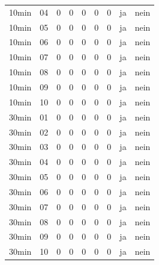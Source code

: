 \begin{longtable}{llrrrrrll}
10min & 04 & 0 & 0 & 0 & 0 & 0 & ja & nein \\
10min & 05 & 0 & 0 & 0 & 0 & 0 & ja & nein \\
10min & 06 & 0 & 0 & 0 & 0 & 0 & ja & nein \\
10min & 07 & 0 & 0 & 0 & 0 & 0 & ja & nein \\
10min & 08 & 0 & 0 & 0 & 0 & 0 & ja & nein \\
10min & 09 & 0 & 0 & 0 & 0 & 0 & ja & nein \\
10min & 10 & 0 & 0 & 0 & 0 & 0 & ja & nein \\
30min & 01 & 0 & 0 & 0 & 0 & 0 & ja & nein \\
30min & 02 & 0 & 0 & 0 & 0 & 0 & ja & nein \\
30min & 03 & 0 & 0 & 0 & 0 & 0 & ja & nein \\
30min & 04 & 0 & 0 & 0 & 0 & 0 & ja & nein \\
30min & 05 & 0 & 0 & 0 & 0 & 0 & ja & nein \\
30min & 06 & 0 & 0 & 0 & 0 & 0 & ja & nein \\
30min & 07 & 0 & 0 & 0 & 0 & 0 & ja & nein \\
30min & 08 & 0 & 0 & 0 & 0 & 0 & ja & nein \\
30min & 09 & 0 & 0 & 0 & 0 & 0 & ja & nein \\
30min & 10 & 0 & 0 & 0 & 0 & 0 & ja & nein \\
\bottomrule
\end{longtable}
